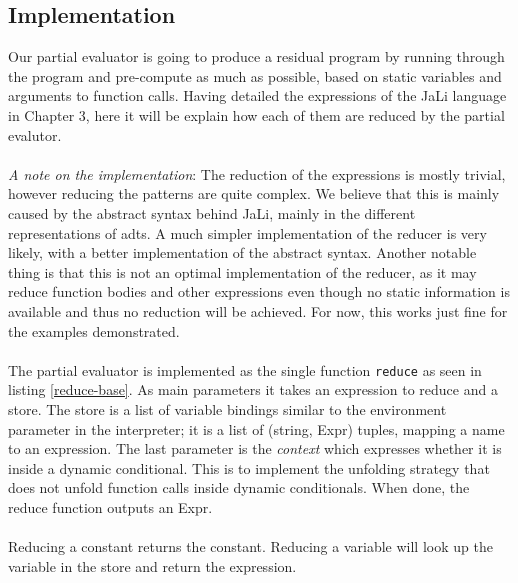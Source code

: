



\subsection{Implementation}
Our partial evaluator is going to produce a residual program by running through the program and pre-compute as much as possible, based on static variables and arguments to function calls. Having detailed the expressions of the JaLi language in Chapter 3, here it will be explain how each of them are reduced by the partial evalutor. 
\\\\
\textit{A note on the implementation}: The reduction of the expressions is mostly trivial, however reducing the patterns are quite complex. We believe that this is mainly caused by the abstract syntax behind JaLi, mainly in the different representations of \glspl{adt}. A much simpler implementation of the reducer is very likely, with a better implementation of the abstract syntax. Another notable thing is that this is not an optimal implementation of the reducer, as it may reduce function bodies and other expressions even though no static information is available and thus no reduction will be achieved. For now, this works just fine for the examples demonstrated.
\\\\
The partial evaluator is implemented as the single function \texttt{reduce} as seen in listing \ref{reduce-base}. As main parameters it takes an expression to reduce and a store. The store is a list of variable bindings similar to the environment parameter in the interpreter; it is a list of (string, Expr) tuples, mapping a name to an expression. The last parameter is the \textit{context} which expresses whether it is inside a dynamic conditional. This is to implement the unfolding strategy that does not unfold function calls inside dynamic conditionals. When done, the reduce function outputs an Expr.
\\\\
Reducing a constant returns the constant. Reducing a variable will look up the variable in the store and return the expression. 

